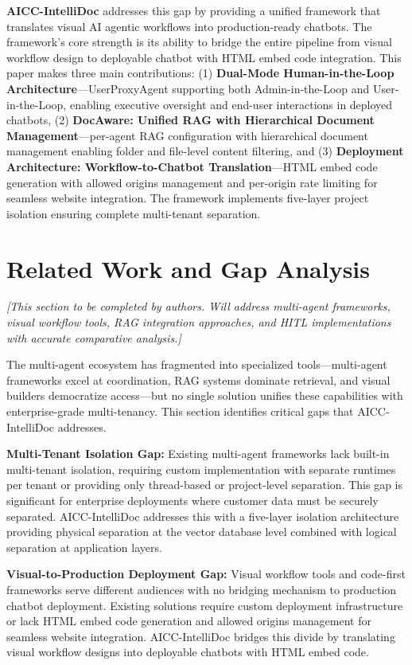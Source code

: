 \documentclass[11pt]{article}
\begin{document}
\textbf{AICC-IntelliDoc} addresses this gap by providing a unified framework that translates visual AI agentic workflows into production-ready chatbots. The framework's core strength is its ability to bridge the entire pipeline from visual workflow design to deployable chatbot with HTML embed code integration. This paper makes three main contributions: (1) \textbf{Dual-Mode Human-in-the-Loop Architecture}—UserProxyAgent supporting both Admin-in-the-Loop and User-in-the-Loop, enabling executive oversight and end-user interactions in deployed chatbots, (2) \textbf{DocAware: Unified RAG with Hierarchical Document Management}—per-agent RAG configuration with hierarchical document management enabling folder and file-level content filtering, and (3) \textbf{Deployment Architecture: Workflow-to-Chatbot Translation}—HTML embed code generation with allowed origins management and per-origin rate limiting for seamless website integration. The framework implements five-layer project isolation ensuring complete multi-tenant separation.

\section{Related Work and Gap Analysis}

\textit{[This section to be completed by authors. Will address multi-agent frameworks, visual workflow tools, RAG integration approaches, and HITL implementations with accurate comparative analysis.]}

The multi-agent ecosystem has fragmented into specialized tools—multi-agent frameworks excel at coordination, RAG systems dominate retrieval, and visual builders democratize access—but no single solution unifies these capabilities with enterprise-grade multi-tenancy. This section identifies critical gaps that AICC-IntelliDoc addresses.

\textbf{Multi-Tenant Isolation Gap:} Existing multi-agent frameworks lack built-in multi-tenant isolation, requiring custom implementation with separate runtimes per tenant or providing only thread-based or project-level separation. This gap is significant for enterprise deployments where customer data must be securely separated. AICC-IntelliDoc addresses this with a five-layer isolation architecture providing physical separation at the vector database level combined with logical separation at application layers.

\textbf{Visual-to-Production Deployment Gap:} Visual workflow tools and code-first frameworks serve different audiences with no bridging mechanism to production chatbot deployment. Existing solutions require custom deployment infrastructure or lack HTML embed code generation and allowed origins management for seamless website integration. AICC-IntelliDoc bridges this divide by translating visual workflow designs into deployable chatbots with HTML embed code.
\end{document}
